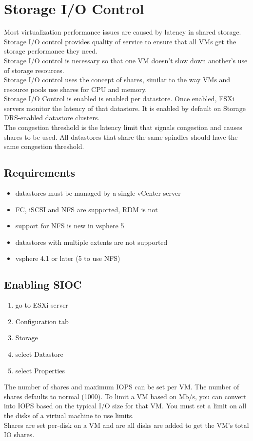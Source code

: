 \section{Storage I/O Control}

Most virtualization performance issues are caused by latency in shared
storage. Storage I/O control provides quality of service to ensure that all
VMs get the storage performance they need.\\

Storage I/O control is necessary so that one VM doesn't slow down another's
use of storage resources.\\

Storage I/O control uses the concept of shares, similar to the way VMs
and resource pools use shares for CPU and memory.\\

Storage I/O Control is enabled is enabled per datastore. Once enabled, ESXi
servers monitor the latency of that datastore. It is enabled by default on
Storage DRS-enabled datastore clusters.\\

The congestion threshold is the latency limit that signals congestion and
causes shares to be used. All datastores that share the same spindles should
have the same congestion threshold.

\subsection{Requirements}

\begin{itemize}
\item datastores must be managed by a single vCenter server
\item FC, iSCSI and NFS are supported, RDM is not
\item support for NFS is new in vsphere 5
\item datastores with multiple extents are not supported
\item vsphere 4.1 or later (5 to use NFS)
\end{itemize}

\subsection{Enabling SIOC}

\begin{enumerate}
\item go to ESXi server
\item Configuration tab
\item Storage
\item select Datastore
\item select Properties
\end{enumerate}

The number of shares and maximum IOPS can be set per VM. The number of shares
defaults to normal (1000). To limit a VM based on Mb/s, you can convert into
IOPS based on the typical I/O size for that VM. You must set a limit on all
the disks of a virtual machine to use limits.\\

Shares are set per-disk on a VM and are all disks are added to get the VM's
total IO shares.
